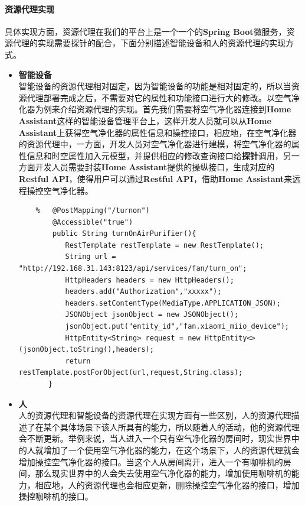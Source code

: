 \documentclass[12pt,a4paper]{article}
\theoremstyle{definition}
\begin{document}
\paragraph{资源代理实现}
具体实现方面，资源代理在我们的平台上是一个一个的\textbf{Spring Boot}微服务，资源代理的实现需要探针的配合，下面分别描述智能设备和人的资源代理的实现方式。
\begin{itemize}
 \item{\textbf{智能设备}}\\
 智能设备的资源代理相对固定，因为智能设备的功能是相对固定的，所以当资源代理部署完成之后，不需要对它的属性和功能接口进行大的修改。以空气净化器为例来介绍资源代理的实现。首先我们需要将空气净化器连接到\textbf{Home Assistant}这样的智能设备管理平台上，这样开发人员就可以从\textbf{Home Assistant}上获得空气净化器的属性信息和操控接口，相应地，在空气净化器的资源代理中，一方面，开发人员对空气净化器进行建模，将空气净化器的属性信息和时空属性加入元模型，并提供相应的修改查询接口给\textbf{探针}调用，另一方面开发人员需要封装\textbf{Home Assistant}提供的操纵接口，生成对应的\textbf{Restful API}，使得用户可以通过\textbf{Restful API}，借助\textbf{Home Assistant}来远程操控空气净化器。
 \begin{lstlisting}
    %   @PostMapping("/turnon")
        @Accessible("true")
        public String turnOnAirPurifier(){
           RestTemplate restTemplate = new RestTemplate();
           String url = "http://192.168.31.143:8123/api/services/fan/turn_on";
           HttpHeaders headers = new HttpHeaders();
           headers.add("Authorization","xxxxx");
           headers.setContentType(MediaType.APPLICATION_JSON);
           JSONObject jsonObject = new JSONObject();
           jsonObject.put("entity_id","fan.xiaomi_miio_device");
           HttpEntity<String> request = new HttpEntity<>(jsonObject.toString(),headers);
           return restTemplate.postForObject(url,request,String.class);
       }
    \end{lstlisting}
    \item{\textbf{人}}\\
    人的资源代理和智能设备的资源代理在实现方面有一些区别，人的资源代理描述了在某个具体场景下该人所具有的能力，所以随着人的活动，他的资源代理会不断更新。举例来说，当人进入一个只有空气净化器的房间时，现实世界中的人就增加了一个使用空气净化器的能力，在这个场景下，人的资源代理就会增加操控空气净化器的接口。当这个人从房间离开，进入一个有咖啡机的房间，那么现实世界中的人会失去使用空气净化器的能力，增加使用咖啡机的能力，相应地，人的资源代理也会相应更新，删除操控空气净化器的接口，增加操控咖啡机的接口。
\end{itemize}
\end{document}
